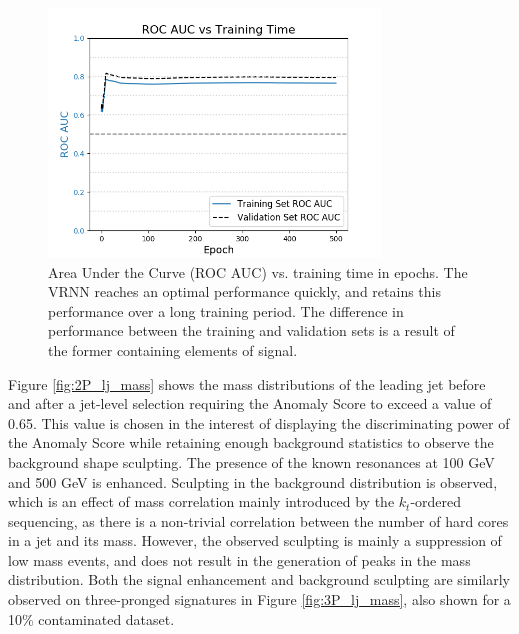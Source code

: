 \documentclass[12pt, a4paper]{article}
\begin{document}
\begin{figure}[H]
	\begin{center}
		\includegraphics[width=250pt]{imgs/auc_vs_epoch_SaveForPaper.png}
	\end{center}
	\caption{Area Under the Curve (ROC AUC) vs. training time in epochs. The VRNN reaches an optimal performance quickly, and retains this performance over a long training period. The difference in performance between the training and validation sets is a result of the former containing elements of signal.}
	\label{fig:auc_vs_epoch}
\end{figure}

Figure \ref{fig:2P_lj_mass} shows the mass distributions of the leading jet before and after a jet-level selection requiring the Anomaly Score to exceed a value of 0.65. This value is chosen in the interest of displaying the discriminating power of the Anomaly Score while retaining enough background statistics to observe the background shape sculpting. The presence of the known resonances at 100 GeV and 500 GeV is enhanced. Sculpting in the background distribution is observed, which is an effect of mass correlation mainly introduced by the $k_{t}$-ordered sequencing, as there is a non-trivial correlation between the number of hard cores in a jet and its mass. However, the observed sculpting is mainly a suppression of low mass events, and does not result in the generation of peaks in the mass distribution. Both the signal enhancement and background sculpting are similarly observed on three-pronged signatures in Figure \ref{fig:3P_lj_mass}, also shown for a 10\% contaminated dataset. 
\end{document}

